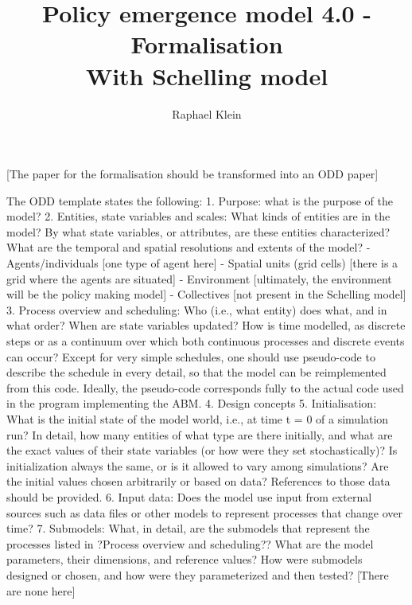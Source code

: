 \documentclass[11pt]{article}
\title{Policy emergence model 4.0 - Formalisation \\ With Schelling model}
\author{Raphael Klein}
\begin{document}
\maketitle



\tableofcontents

[The paper for the formalisation should be transformed into an ODD paper]

The ODD template states the following:
1. Purpose: what is the purpose of the model?
2. Entities, state variables and scales: What kinds of entities are in the model? By what state variables, or attributes, are these entities characterized? What are the temporal and spatial resolutions and extents of the model?
	- Agents/individuals [one type of agent here]
	- Spatial units (grid cells) [there is a grid where the agents are situated]
	- Environment [ultimately, the environment will be the policy making model]
	- Collectives [not present in the Schelling model]
3. Process overview and scheduling: Who (i.e., what entity) does what, and in what order? When are state variables updated? How is time modelled, as discrete steps or as a continuum over which both continuous processes and discrete events can occur? Except for very simple schedules, one should use pseudo-code to describe the schedule in every detail, so that the model can be reimplemented from this code. Ideally, the pseudo-code corresponds fully to the actual code used in the program implementing the ABM.
4. Design concepts
5. Initialisation: What is the initial state of the model world, i.e., at time t = 0 of a simulation run? In detail, how many entities of what type are there initially, and what are the exact values of their state variables (or how were they set stochastically)? Is initialization always the same, or is it allowed to vary among simulations? Are the initial values chosen arbitrarily or based on data? References to those data should be provided.
6. Input data: Does the model use input from external sources such as data files or other models to represent processes that change over time?
7. Submodels: What, in detail, are the submodels that represent the processes listed in ?Process overview and scheduling?? What are the model parameters, their dimensions, and reference values? How were submodels designed or chosen, and how were they parameterized and then tested? [There are none here]
\end{document}
